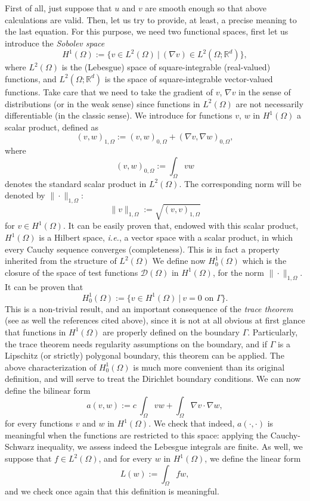 \documentclass{article}
\begin{document}
First of all, just suppose that $u$ and $v$ are smooth enough so that above calculations are valid. Then, let us try to provide, at least, a precise meaning to the last equation. For this purpose, we need two functional spaces, first let us introduce the \emph{Sobolev space}
\[
H^1(\Omega) := \{ 
v \in L^2(\Omega) \ | \ 
(\nabla v) \in L^2(\Omega;\mathbb{R}^d) \},
\]
where $L^2(\Omega)$ is the (Lebesgue) space of square-integrable (real-valued) functions, and $L^2(\Omega;\mathbb{R}^d)$ is the space of square-integrable vector-valued functions. Take care that we need to take the gradient of $v$, $\nabla v$ in the sense of distributions (or in the weak sense) since functions in $L^2(\Omega)$ are not necessarily differentiable (in the classic sense).
We introduce for functions $v$, $w$ in $H^1(\Omega)$ a scalar product, defined as
\[
(v, w)_{1,\Omega} := (v,w)_{0,\Omega} + (\nabla v, \nabla w)_{0,\Omega},
\]
where $$(v,w)_{0,\Omega} := \int_\Omega v w$$ denotes the standard scalar product in $L^2(\Omega)$. The corresponding norm will be denoted by $\| \cdot \|_{1,\Omega}$:
\[
\| v \|_{1,\Omega} := \sqrt{(v,v)_{1,\Omega}}
\]
for $v\in H^1(\Omega)$.
It can be easily proven that, endowed with this scalar product, $H^1(\Omega)$ is a Hilbert space, \emph{i.e.}, a vector space with a scalar product, in which every Cauchy sequence converges (completeness). This is in fact a property inherited from the structure of $L^2(\Omega)$ 
\cite{raviart83,sayas19}
We define now $H^1_0(\Omega)$ which is the closure of the space of test functions $\mathcal{D} (\Omega)$ in $H^1(\Omega)$, for the norm $\| \cdot \|_{1,\Omega}$. It can be proven that
\[
H^1_0(\Omega) := \{ 
v \in H^1(\Omega) \ | \ 
v = 0 \textrm{ on } \Gamma\}.
\]
This is a non-trivial result, and an important consequence of the \emph{trace theorem} (see as well the references cited above), since it is not at all obvious at first glance that functions in $H^1(\Omega)$ are properly defined on the boundary $\Gamma$. Particularly, the trace theorem needs regularity assumptions on the boundary, and if $\Gamma$ is a Lipschitz (or strictly) polygonal boundary, this theorem can be applied.
The above characterization of $H^1_0(\Omega)$ is much more convenient than its original definition, and will serve to treat the Dirichlet boundary conditions. We can now define the bilinear form
\[
a ( v , w) := 
c\ \int_\Omega v w + \int_\Omega \nabla v \cdot \nabla w,
\]
for every functions $v$ and $w$ in $H^1(\Omega)$. We check that indeed, $a(\cdot,\cdot)$ is meaningful when the functions are restricted to this space: applying the Cauchy-Schwarz inequality, we assess indeed the Lebesgue integrals are finite. As well, we suppose that $f \in L^2(\Omega)$, and for every $w$ in $H^1(\Omega)$, we define the linear form
\[
L(w) := \int_\Omega f w,
\]
and we check once again that this definition is meaningful.
\end{document}
